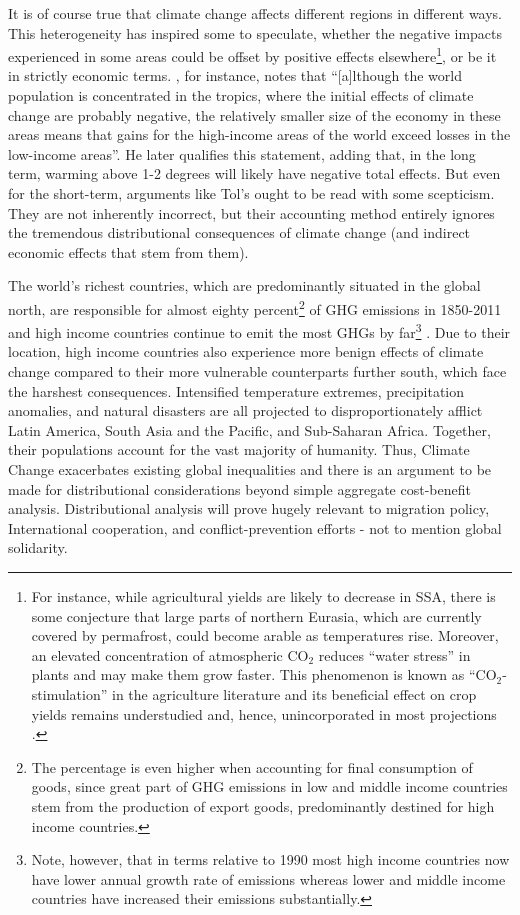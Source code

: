 \documentclass[a4paper,12pt]{article}
\theoremstyle{plain}
\theoremstyle{definition}
\theoremstyle{definition}
\theoremstyle{definition}
\theoremstyle{definition}
\begin{document}
It is of course true that climate change affects different regions in different ways. This heterogeneity has inspired some to speculate, whether the negative impacts experienced in some areas could be offset by positive effects elsewhere\footnote{For instance, while agricultural yields are likely to decrease in SSA, there is some conjecture that large parts of northern Eurasia, which are currently covered by permafrost, could become arable as temperatures rise. Moreover, an elevated concentration of atmospheric CO$_2$ reduces “water stress” in plants and may make them grow faster. This phenomenon is known as ``CO$_2$-stimulation'' in the agriculture literature and its beneficial effect on crop yields remains understudied and, hence, unincorporated in most projections \citep[e.g., in][]{Schlenker2010}.}, or be it in strictly economic terms. \citet{Tol2009}, for instance, notes that ``[a]lthough the world population is concentrated in the tropics, where the initial effects of climate change are probably negative, the relatively smaller size of the economy in these areas means that gains for the high-income areas of the world exceed losses in the low-income areas''. He later qualifies this statement, adding that, in the long term, warming above 1-2 degrees will likely have negative total effects. But even for the short-term, arguments like Tol's ought to be read with some scepticism. They are not inherently incorrect, but their accounting method entirely ignores the tremendous distributional consequences of climate change (and indirect economic effects that stem from them).

The world's richest countries, which are predominantly situated in  the global north, are responsible for almost eighty percent\footnote{The percentage is even higher when accounting for final consumption of goods, since great part of GHG emissions in low and middle income countries stem from the production of export goods, predominantly destined for high income countries.} of GHG emissions in 1850-2011 and high income countries continue to emit the most GHGs by far\footnote{Note, however, that in terms relative to 1990 most high income countries now have lower annual growth rate of emissions whereas lower and middle income countries have increased their emissions substantially.} \citep{Ritchie2017}. Due to their location, high income countries also experience more benign effects of climate change compared to their more vulnerable counterparts further south, which face the harshest consequences. Intensified temperature extremes, precipitation anomalies, and natural disasters are all projected to disproportionately afflict Latin America, South Asia and the Pacific, and Sub-Saharan Africa. Together, their populations account for the vast majority of humanity. Thus, Climate Change exacerbates existing global inequalities and there is an argument to be made for distributional considerations beyond simple aggregate cost-benefit analysis. Distributional analysis will prove hugely relevant to migration policy, International cooperation, and conflict-prevention efforts - not to mention global solidarity.
\end{document}
